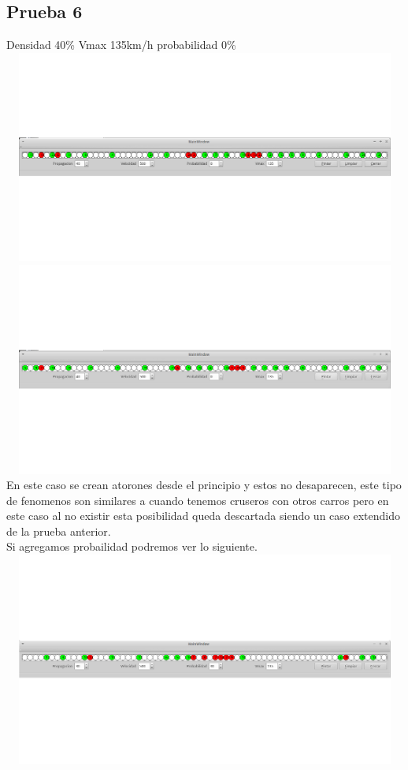 \documentclass[a4paper,10pt]{article}
\begin{document}
\subsection{Prueba 6}
Densidad 40\% Vmax 135km/h probabilidad 0\%
\\
\includegraphics[width=15cm, height=7cm]{23}
\\
\includegraphics[width=15cm, height=7cm]{24}
\\
En este caso se crean atorones desde el principio y estos no desaparecen, este tipo de fenomenos son similares a cuando tenemos cruseros con otros carros pero en este caso al no existir esta posibilidad queda descartada siendo un caso extendido de la prueba anterior.\\
Si agregamos probailidad podremos ver lo siguiente.
\\
\includegraphics[width=15cm, height=7cm]{21}
\end{document}
